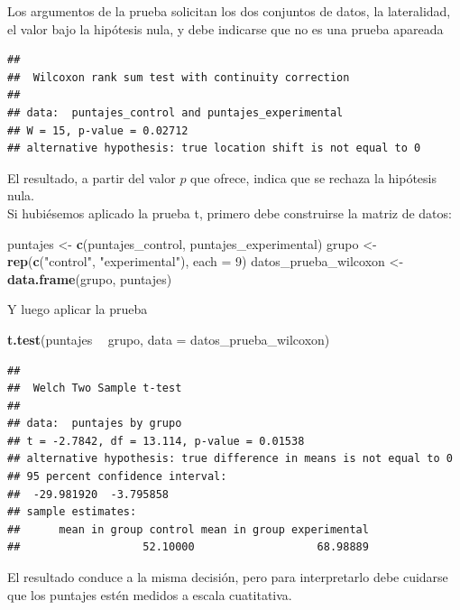 \documentclass[]{book}
\newenvironment{Shaded}{\begin{snugshade}}{\end{snugshade}}
\newcommand{\DataTypeTok}[1]{\textcolor[rgb]{0.13,0.29,0.53}{#1}}
\newcommand{\DecValTok}[1]{\textcolor[rgb]{0.00,0.00,0.81}{#1}}
\newcommand{\KeywordTok}[1]{\textcolor[rgb]{0.13,0.29,0.53}{\textbf{#1}}}
\newcommand{\NormalTok}[1]{#1}
\newcommand{\OperatorTok}[1]{\textcolor[rgb]{0.81,0.36,0.00}{\textbf{#1}}}
\newcommand{\StringTok}[1]{\textcolor[rgb]{0.31,0.60,0.02}{#1}}
\begin{document}
Los argumentos de la prueba solicitan los dos conjuntos de datos, la lateralidad, el valor bajo la hipótesis nula, y debe indicarse que no es una prueba apareada

\begin{verbatim}
## 
##  Wilcoxon rank sum test with continuity correction
## 
## data:  puntajes_control and puntajes_experimental
## W = 15, p-value = 0.02712
## alternative hypothesis: true location shift is not equal to 0
\end{verbatim}

El resultado, a partir del valor \(p\) que ofrece, indica que se rechaza la hipótesis nula.\\
Si hubiésemos aplicado la prueba t, primero debe construirse la matriz de datos:

\begin{Shaded}
\begin{Highlighting}[]
\NormalTok{puntajes <-}\StringTok{ }\KeywordTok{c}\NormalTok{(puntajes_control, puntajes_experimental)}
\NormalTok{grupo <-}\StringTok{ }\KeywordTok{rep}\NormalTok{(}\KeywordTok{c}\NormalTok{(}\StringTok{"control"}\NormalTok{, }\StringTok{"experimental"}\NormalTok{), }\DataTypeTok{each =} \DecValTok{9}\NormalTok{)}
\NormalTok{datos_prueba_wilcoxon <-}\StringTok{ }\KeywordTok{data.frame}\NormalTok{(grupo, puntajes)}
\end{Highlighting}
\end{Shaded}

Y luego aplicar la prueba

\begin{Shaded}
\begin{Highlighting}[]
\KeywordTok{t.test}\NormalTok{(puntajes }\OperatorTok{~}\StringTok{ }\NormalTok{grupo, }\DataTypeTok{data =}\NormalTok{ datos_prueba_wilcoxon)}
\end{Highlighting}
\end{Shaded}

\begin{verbatim}
## 
##  Welch Two Sample t-test
## 
## data:  puntajes by grupo
## t = -2.7842, df = 13.114, p-value = 0.01538
## alternative hypothesis: true difference in means is not equal to 0
## 95 percent confidence interval:
##  -29.981920  -3.795858
## sample estimates:
##      mean in group control mean in group experimental 
##                   52.10000                   68.98889
\end{verbatim}

El resultado conduce a la misma decisión, pero para interpretarlo debe cuidarse que los puntajes estén medidos a escala cuatitativa.
\end{document}
